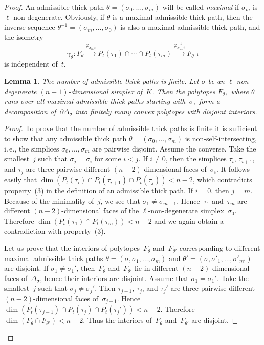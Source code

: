 \documentclass[reqno,tbtags,12pt]{amsart}
\numberwithin{equation}{section}
\newcommand{\bell}{\boldsymbol{\ell}}
\newtheorem{lem}[theorem]{Lemma}
\theoremstyle{definition}
\begin{document}
\begin{proof}
An admissible thick path $\theta=(\sigma_0,\ldots,\sigma_m)$ will be called \textit{maximal\/} if $\sigma_m$ is $\bell$-non-dege\-n\-erate. Obviously, if $\theta$ is a maximal admissible thick path, then the inverse sequence $\theta^{-1}=(\sigma_m,\ldots,\sigma_0)$ is also a maximal admissible thick path, and the isometry 
$$
\gamma_{\theta}\colon F_{\theta}\xrightarrow{\varphi_{\sigma_0,t}}P_t(\tau_1)\cap\cdots\cap P_t(\tau_m)\xrightarrow{\varphi_{\sigma_m,t}^{-1}}F_{\theta^{-1}}
$$
is independent of~$t$.




\begin{lem}
The number of admissible thick paths is finite.
Let $\sigma$ be an $\bell$-non-degene\-rate $(n-1)$-dimensional simplex of~$K$.  Then the  polytopes $F_{\theta},$ where $\theta$ runs over all maximal admissible thick paths starting with~$\sigma,$ form a decomposition of~$\partial  \Delta_{\sigma}$ into finitely many convex polytopes with disjoint interiors.
\end{lem}
\begin{proof}
To prove that the number of admissible thick paths is finite it is sufficient to show that any admissible thick path $\theta=(\sigma_0,\ldots,\sigma_m)$ is non-self-intersecting, i.\,e., the simplices $\sigma_0,\ldots,\sigma_m$ are pairwise disjoint. Assume the converse. Take the smallest~$j$ such that $\sigma_j=\sigma_i$ for some $i<j$. 
If $i\ne 0$, then the simplices $\tau_{i}$, $\tau_{i+1}$, and $\tau_{j}$ are three pairwise different $(n-2)$-dimensional faces of~$\sigma_{i}$. It follows easily that $\dim(P_t(\tau_{i})\cap P_t(\tau_{i+1})\cap P_t(\tau_{j}))<n-2$, which contradicts property~(3) in the definition of an admissible thick  path. If $i=0$, then $j=m$. Because of the minimality of~$j$, we see that $\sigma_1\ne\sigma_{m-1}$. Hence~$\tau_1$ and~$\tau_{m}$  are different $(n-2)$-dimensional faces of the $\bell$-non-degenerate simplex~$\sigma_0$. Therefore $\dim(P_t(\tau_1)\cap P_t(\tau_m))<n-2$ and we again obtain a contradiction with property~(3).

Let us prove that the interiors of polytopes~$F_{\theta}$ and~$F_{\theta'}$ corresponding to different maximal admissible thick paths $\theta=(\sigma,\sigma_1,\ldots,\sigma_m)$ and  $\theta'=(\sigma,\sigma'_1,\ldots,\sigma'_{m'})$ are disjoint. If $\sigma_1\ne\sigma_1'$, then~$F_{\theta}$ and~$F_{\theta'}$ lie in different $(n-2)$-dimensional faces of~$ \Delta_{\sigma}$, hence their interiors are disjoint. Assume that $\sigma_1=\sigma_1'$. Take the smallest~$j$ such that $\sigma_j\ne \sigma_j'$. Then $\tau_{j-1}$, $\tau_j$, and $\tau_j'$ are three pairwise different $(n-2)$-dimensional faces of~$\sigma_{j-1}$. Hence $\dim(P_t(\tau_{j-1})\cap P_t(\tau_{j})\cap P_t(\tau_{j}'))<n-2$. Therefore $\dim (F_{\theta}\cap F_{\theta'})<n-2$. Thus the interiors of~$F_{\theta}$ and~$F_{\theta'}$ are disjoint.


\end{proof}
\end{proof}
\end{document}
